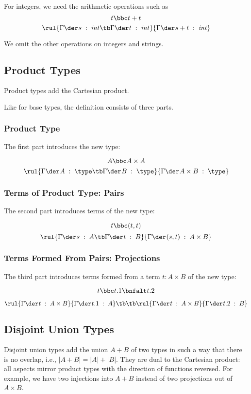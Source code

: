 For integers, we need the arithmetic operations such as
\[t \bbc t+t\]
\[\rul{\oftype{}{\Gamma}{s}{\Int}\tb \oftype{}{\Gamma}{t}{\Int}}{\oftype{}{\Gamma}{s+t}{\Int}}\]

We omit the other operations on integers and strings.

\subsection{Product Types}

Product types add the Cartesian product.

Like for base types, the definition consists of three parts.

\subsubsection{Product Type}

The first part introduces the new type:

\[A \bbc A\times A\]
\[\rul{\oftype{}{\Gamma}{A}{\type}\tb \oftype{}{\Gamma}{B}{\type}}{\oftype{}{\Gamma}{A\times B}{\type}}\]

\subsubsection{Terms of Product Type: Pairs}

The second part introduces terms of the new type:

\[t \bbc (t,t)\]
\[\rul{\oftype{}{\Gamma}{s}{A}\tb \oftype{}{\Gamma}{t}{B}}{\oftype{}{\Gamma}{(s,t)}{A\times B}}\]

\subsubsection{Terms Formed From Pairs: Projections}

The third part introduces terms formed from a term $t:A\times B$ of the new type:

\[t \bbc t.1 \bnfalt t.2\]

\[\rul{\oftype{}{\Gamma}{t}{A\times B}}{\oftype{}{\Gamma}{t.1}{A}}
\tb\tb
 \rul{\oftype{}{\Gamma}{t}{A\times B}}{\oftype{}{\Gamma}{t.2}{B}}\]

\subsection{Disjoint Union Types}

Disjoint union types add the union $A+B$ of two types in such a way that there is no overlap, i.e., $|A+B|=|A|+|B|$.
They are dual to the Cartesian product: all aspects mirror product types with the direction of functions reversed.
For example, we have two injections into $A+B$ instead of two projections out of $A\times B$.

